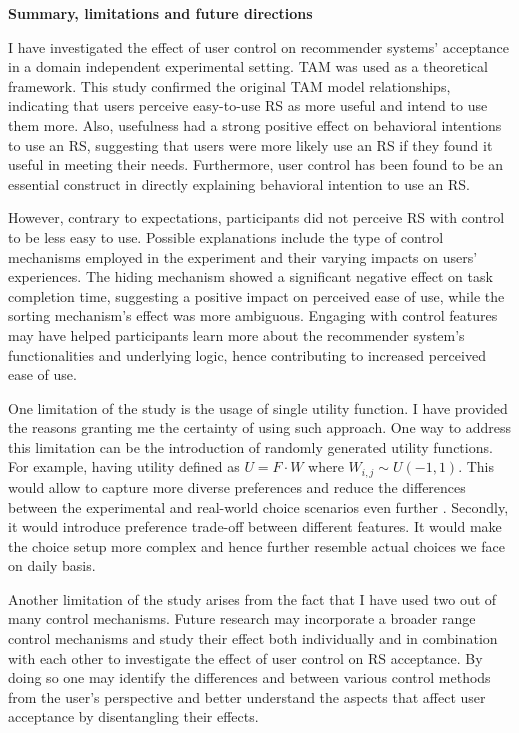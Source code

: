 \documentclass[a4paper,12pt]{article}
\begin{document}
\textbf{Summary, limitations and future directions}

I have investigated the effect of user control on recommender systems' acceptance in a domain independent experimental setting. TAM was used as a theoretical framework. This study confirmed the original TAM model relationships, indicating that users perceive easy-to-use RS as more useful and intend to use them more. Also, usefulness had a strong positive effect on behavioral intentions to use an RS, suggesting that users were more likely use an RS if they found it useful in meeting their needs. Furthermore, user control has been found to be an essential construct in directly explaining behavioral intention to use an RS.

However, contrary to expectations, participants did not perceive RS with control to be less easy to use. Possible explanations include the type of control mechanisms employed in the experiment and their varying impacts on users' experiences. The hiding mechanism showed a significant negative effect on task completion time, suggesting a positive impact on perceived ease of use, while the sorting mechanism's effect was more ambiguous. Engaging with control features may have helped participants learn more about the recommender system's functionalities and underlying logic, hence contributing to increased perceived ease of use.

One limitation of the study is the usage of single utility function. I have provided the reasons granting me the certainty of using such approach. One way to address this limitation can be the introduction of randomly generated utility functions. For example, having utility defined as $U = F \cdot W$ where $W_{i,j} \sim U(-1,1)$. This would allow to capture more diverse preferences and reduce the differences between the experimental and real-world choice scenarios even further \citep{vesanen2007personalization}. Secondly, it would introduce preference trade-off between different features. It would make the choice setup more complex and hence further resemble actual choices we face on daily basis.

Another limitation of the study arises from the fact that I have used two out of many control mechanisms. Future research may incorporate a broader range control mechanisms and study their effect both individually and in combination with each other to investigate the effect of user control on RS acceptance. By doing so one may identify the differences and between various control methods from the user's perspective and better understand the aspects that affect user acceptance by disentangling their effects. 
\end{document}
